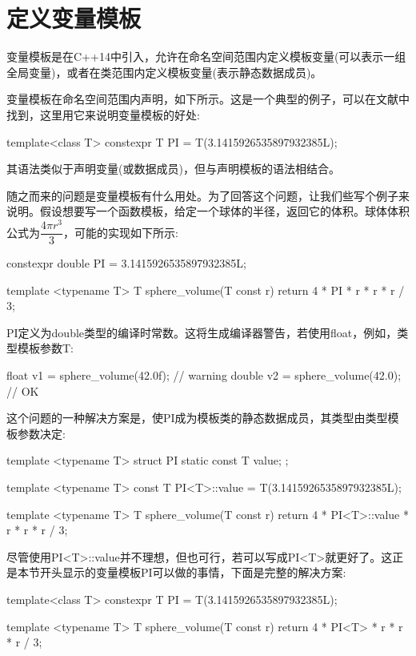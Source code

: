 \section{定义变量模板}
变量模板是在C++14中引入，允许在命名空间范围内定义模板变量(可以表示一组全局变量)，或者在类范围内定义模板变量(表示静态数据成员)。

变量模板在命名空间范围内声明，如下所示。这是一个典型的例子，可以在文献中找到，这里用它来说明变量模板的好处:

\begin{cpp}
template<class T>
constexpr T PI = T(3.1415926535897932385L);
\end{cpp}

其语法类似于声明变量(或数据成员)，但与声明模板的语法相结合。

随之而来的问题是变量模板有什么用处。为了回答这个问题，让我们些写个例子来说明。假设想要写一个函数模板，给定一个球体的半径，返回它的体积。球体体积公式为$\dfrac{4\pi r^{3}}{3}$，可能的实现如下所示:

\begin{cpp}
constexpr double PI = 3.1415926535897932385L;

template <typename T>
T sphere_volume(T const r)
{
	return 4 * PI * r * r * r / 3;
}
\end{cpp}

PI定义为double类型的编译时常数。这将生成编译器警告，若使用float，例如，类型模板参数T:

\begin{cpp}
float v1 = sphere_volume(42.0f); // warning
double v2 = sphere_volume(42.0); // OK
\end{cpp}

这个问题的一种解决方案是，使PI成为模板类的静态数据成员，其类型由类型模板参数决定:

\begin{cpp}
template <typename T>
struct PI
{
	static const T value;
};

template <typename T>
const T PI<T>::value = T(3.1415926535897932385L);

template <typename T>
T sphere_volume(T const r)
{
	return 4 * PI<T>::value * r * r * r / 3;
}
\end{cpp}

尽管使用PI<T>::value并不理想，但也可行，若可以写成PI<T>就更好了。这正是本节开头显示的变量模板PI可以做的事情，下面是完整的解决方案:

\begin{cpp}
template<class T>
constexpr T PI = T(3.1415926535897932385L);

template <typename T>
T sphere_volume(T const r)
{
	return 4 * PI<T> * r * r * r / 3;
}
\end{cpp}

